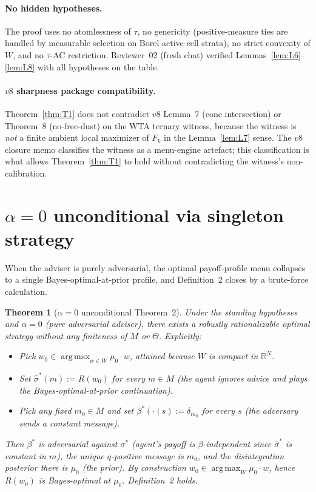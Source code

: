 \documentclass[11pt]{article}
\newtheorem{theorem}{Theorem}
\theoremstyle{definition}
\theoremstyle{remark}
\newcommand{\R}{\mathbb{R}}
\newcommand{\Th}{\Theta}
\newcommand{\argmax}{\operatorname*{arg\,max}}
\begin{document}
\paragraph{No hidden hypotheses.} The proof uses no atomlessness of
$\tau$, no genericity (positive-measure ties are handled by measurable
selection on Borel active-cell strata), no strict convexity of $W$, and
no $\tau$-AC restriction. Reviewer~02 (fresh chat) verified
Lemmas~\ref{lem:L6}--\ref{lem:L8} with all hypotheses on the table.

\paragraph{$v8$ sharpness package compatibility.} Theorem~\ref{thm:T1}
does not contradict $v8$ Lemma~7 (cone intersection) or Theorem~8
(no-free-dust) on the WTA ternary witness, because the witness is
\emph{not} a finite ambient local maximizer of $F_k$ in the
Lemma~\ref{lem:L7} sense. The $v8$ closure memo classifies the witness
as a menu-engine artefact; this classification is what allows
Theorem~\ref{thm:T1} to hold without contradicting the witness's
non-calibration.

\section{$\alpha=0$ unconditional via singleton strategy}\label{sec:t2}

When the adviser is purely adversarial, the optimal payoff-profile menu
collapses to a single Bayes-optimal-at-prior profile, and Definition~2
closes by a brute-force calculation.

\begin{theorem}[$\alpha=0$ unconditional Theorem~2]\label{thm:T2}
Under the standing hypotheses and $\alpha=0$ (pure adversarial adviser),
there exists a robustly rationalizable optimal strategy without any
finiteness of $M$ or $\Th$. Explicitly:
\begin{itemize}[leftmargin=*]
  \item Pick $w_0\in\argmax_{w\in W}\mu_0\!\cdot w$, attained because $W$
    is compact in $\R^N$.
  \item Set $\hat\sigma^*(m) := R(w_0)$ for every $m\in M$ (the agent
    ignores advice and plays the Bayes-optimal-at-prior continuation).
  \item Pick any fixed $m_0\in M$ and set $\beta^*(\cdot\mid s) := \delta_{m_0}$
    for every $s$ (the adversary sends a constant message).
\end{itemize}
Then $\beta^*$ is adversarial against $\sigma^*$ (agent's payoff is
$\beta$-independent since $\hat\sigma^*$ is constant in $m$), the unique
$q$-positive message is $m_0$, and the disintegration posterior there
is $\mu_0$ (the prior). By construction $w_0\in\argmax_W\mu_0\!\cdot w$,
hence $R(w_0)$ is Bayes-optimal at $\mu_0$. Definition~2 holds.
\end{theorem}
\end{document}
